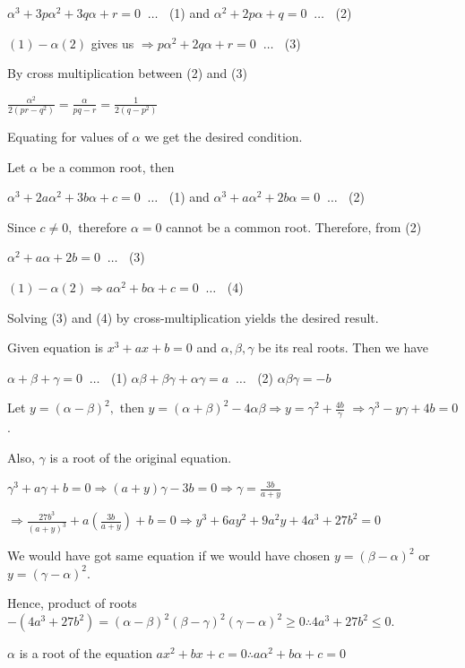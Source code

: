   $\alpha^3 + 3p\alpha^2 + 3q\alpha + r = 0\;\;\ldots\;\;$  (1) and $\alpha^2 + 2p\alpha + q = 0\;\;\ldots\;\;$ (2)

  $(1) - \alpha (2)$ gives us $\Rightarrow p\alpha^2 + 2q\alpha + r = 0\;\;\ldots\;\;$ (3)

  By cross multiplication between (2) and (3)

  $\frac{\alpha^2}{2(pr - q^2)} = \frac{\alpha}{pq - r} = \frac{1}{2(q - p^2)}$

  Equating for values of $\alpha$ we get the desired condition.
\item Let $\alpha$ be a common root, then

  $\alpha^3 + 2a\alpha^2 + 3b\alpha + c = 0\;\;\ldots\;\;$ (1) and $\alpha^3 + a\alpha^2 + 2b\alpha = 0\;\;\ldots\;\;$ (2)

  Since $c \ne 0,$ therefore $\alpha = 0$ cannot be a common root. Therefore, from (2)

  $\alpha^2 + a\alpha + 2b = 0\;\;\ldots\;\;$ (3)

  $(1) - \alpha (2) \Rightarrow a\alpha^2 + b\alpha + c = 0\;\;\ldots\;\;$ (4)

  Solving (3) and (4) by cross-multiplication yields the desired result.
\item Given equation is $x^3 + ax + b = 0$ and $\alpha, \beta, \gamma$ be its real roots. Then we have

  $\alpha + \beta + \gamma = 0\;\;\ldots\;\;$ (1) $\alpha\beta + \beta\gamma + \alpha\gamma = a\;\;\ldots\;\;$ (2)
  $\alpha\beta\gamma = -b$

  Let $y = (\alpha - \beta)^2,$ then $y = (\alpha + \beta)^2 - 4\alpha\beta\Rightarrow y = \gamma^2 +
  \frac{4b}{\gamma}$ $\Rightarrow \gamma^3 - y\gamma + 4b = 0$.

  Also, $\gamma$ is a root of the original equation.

  $\gamma^3 + a\gamma + b = 0\Rightarrow (a + y)\gamma - 3b = 0 \Rightarrow \gamma = \frac{3b}{a + y}$

  $\Rightarrow \frac{27b^3}{(a + y)^3} + a\left(\frac{3b}{a + y}\right) + b = 0\Rightarrow y^3 + 6ay^2 +
  9a^2y + 4a^3 + 27b^2 = 0$

  We would have got same equation if we would have chosen $y = (\beta - \alpha)^2$ or $y = (\gamma - \alpha)^2$.

  Hence, product of roots $-(4a^3 + 27b^2) = (\alpha - \beta)^2(\beta - \gamma)^2(\gamma - \alpha)^2 \ge
  0\therefore 4a^3 + 27b^2 \le 0$.
\item $\alpha$ is a root of the equation $ax^2 + bx + c = 0\therefore a\alpha^2 + b\alpha + c = 0$

